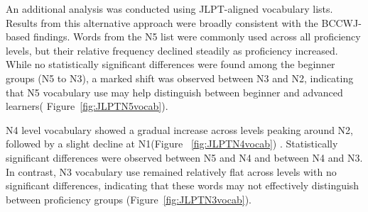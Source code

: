




An additional analysis was conducted using JLPT-aligned vocabulary lists. Results from this alternative
approach were broadly consistent with the BCCWJ-based findings. Words from the
N5 list were commonly used across all proficiency levels, but their relative frequency declined steadily as
proficiency increased.
While no statistically significant differences were found among the beginner groups (N5 to N3), a marked shift
was observed between
N3 and N2, indicating that N5 vocabulary use may help distinguish between beginner and advanced learners(
Figure~\ref{fig:JLPTN5vocab}).

N4 level vocabulary showed a gradual increase across levels peaking around N2, followed by a slight decline 
at N1(Figure~
\ref{fig:JLPTN4vocab})
. Statistically significant
differences were observed between N5 and N4 and
between N4 and N3. In contrast, N3 vocabulary use remained relatively flat across levels with no 
significant 
differences,
indicating that these words may not effectively distinguish between proficiency groups (Figure~\ref{fig:JLPTN3vocab}).

